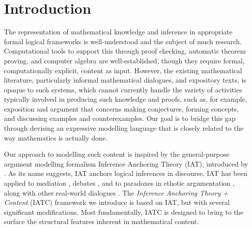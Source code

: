 \documentclass[smallextended,oneside]{svjour3}       %
\let\cite\citep
\begin{document}
\clearpage

\section{Introduction}\label{intro}

The representation of mathematical knowledge and inference in appropriate formal logical frameworks is well-understood and the subject of much research. Computational tools to support this through proof checking, automatic theorem proving, and computer algebra are well-established, though they require  formal, computationally explicit, content as input. However, the existing mathematical literature, particularly informal mathematical dialogues, and expository texts, is opaque to such systems, which  cannot currently handle  the variety of activities typically involved in producing such knowledge and proofs, such as, for example, exposition and argument that concerns making conjectures, forming concepts, and discussing  examples and counterexamples.  Our goal is to bridge this gap through devising an expressive modelling language that is closely related to the way mathematics is actually done.

Our approach to modelling such content is inspired by the general-purpose argument modelling formalism Inference Anchoring Theory (IAT), introduced by \citet{reed2011dialogues}. As its name suggests, IAT anchors logical inferences in discourse. IAT has been applied to mediation 
\cite{janier2017towards}, debates \cite{budzynska2014model}, and to paradoxes in ethotic argumentation \cite{budzynska2013circularity}, along with other real-world dialogues \cite{budzynska2013towards}. The \emph{Inference Anchoring Theory + Content} (IATC) framework we introduce is based on IAT, but with several significant modifications.  Most fundamentally, IATC is designed to bring to the surface the structural features inherent in mathematical content.
\end{document}
